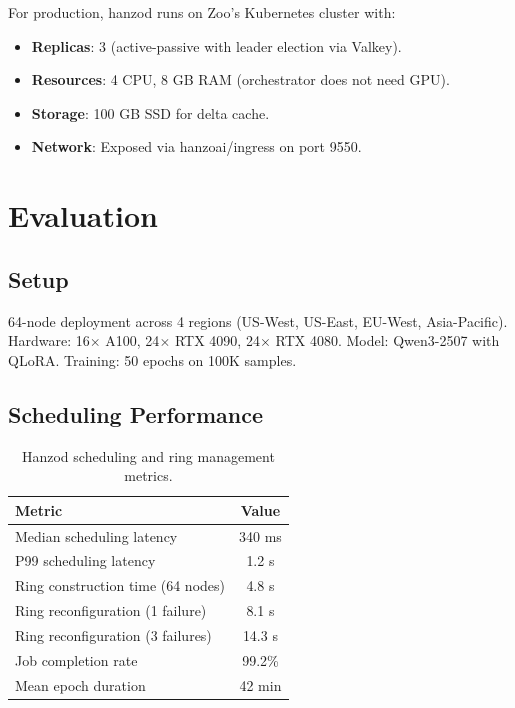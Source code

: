 \documentclass[11pt,letterpaper]{article}
\begin{document}
For production, hanzod runs on Zoo's Kubernetes cluster with:

\begin{itemize}
    \item \textbf{Replicas}: 3 (active-passive with leader election via Valkey).
    \item \textbf{Resources}: 4 CPU, 8 GB RAM (orchestrator does not need GPU).
    \item \textbf{Storage}: 100 GB SSD for delta cache.
    \item \textbf{Network}: Exposed via hanzoai/ingress on port 9550.
\end{itemize}

\section{Evaluation}
\label{sec:evaluation}

\subsection{Setup}

64-node deployment across 4 regions (US-West, US-East, EU-West, Asia-Pacific).  Hardware: 16$\times$ A100, 24$\times$ RTX 4090, 24$\times$ RTX 4080.  Model: Qwen3-2507 with QLoRA.  Training: 50 epochs on 100K samples.

\subsection{Scheduling Performance}

\begin{table}[t]
\centering
\begin{tabular}{lc}
\toprule
\textbf{Metric} & \textbf{Value} \\
\midrule
Median scheduling latency & 340 ms \\
P99 scheduling latency & 1.2 s \\
Ring construction time (64 nodes) & 4.8 s \\
Ring reconfiguration (1 failure) & 8.1 s \\
Ring reconfiguration (3 failures) & 14.3 s \\
Job completion rate & 99.2\% \\
Mean epoch duration & 42 min \\
\bottomrule
\end{tabular}
\caption{Hanzod scheduling and ring management metrics.}
\label{tab:scheduling}
\end{table}
\end{document}
